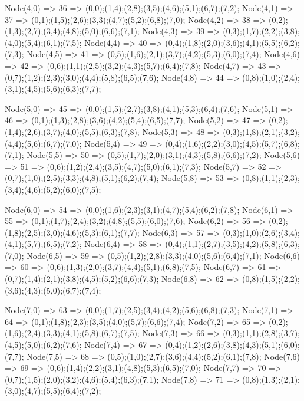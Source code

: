 Node(4,0) => 36 => (0,0);(1,4);(2,8);(3,5);(4,6);(5,1);(6,7);(7,2);
Node(4,1) => 37 => (0,1);(1,5);(2,6);(3,3);(4,7);(5,2);(6,8);(7,0);
Node(4,2) => 38 => (0,2);(1,3);(2,7);(3,4);(4,8);(5,0);(6,6);(7,1);
Node(4,3) => 39 => (0,3);(1,7);(2,2);(3,8);(4,0);(5,4);(6,1);(7,5);
Node(4,4) => 40 => (0,4);(1,8);(2,0);(3,6);(4,1);(5,5);(6,2);(7,3);
Node(4,5) => 41 => (0,5);(1,6);(2,1);(3,7);(4,2);(5,3);(6,0);(7,4);
Node(4,6) => 42 => (0,6);(1,1);(2,5);(3,2);(4,3);(5,7);(6,4);(7,8);
Node(4,7) => 43 => (0,7);(1,2);(2,3);(3,0);(4,4);(5,8);(6,5);(7,6);
Node(4,8) => 44 => (0,8);(1,0);(2,4);(3,1);(4,5);(5,6);(6,3);(7,7);



Node(5,0) => 45 => (0,0);(1,5);(2,7);(3,8);(4,1);(5,3);(6,4);(7,6);
Node(5,1) => 46 => (0,1);(1,3);(2,8);(3,6);(4,2);(5,4);(6,5);(7,7);
Node(5,2) => 47 => (0,2);(1,4);(2,6);(3,7);(4,0);(5,5);(6,3);(7,8);
Node(5,3) => 48 => (0,3);(1,8);(2,1);(3,2);(4,4);(5,6);(6,7);(7,0);
Node(5,4) => 49 => (0,4);(1,6);(2,2);(3,0);(4,5);(5,7);(6,8);(7,1);
Node(5,5) => 50 => (0,5);(1,7);(2,0);(3,1);(4,3);(5,8);(6,6);(7,2);
Node(5,6) => 51 => (0,6);(1,2);(2,4);(3,5);(4,7);(5,0);(6,1);(7,3);
Node(5,7) => 52 => (0,7);(1,0);(2,5);(3,3);(4,8);(5,1);(6,2);(7,4);
Node(5,8) => 53 => (0,8);(1,1);(2,3);(3,4);(4,6);(5,2);(6,0);(7,5);



Node(6,0) => 54 => (0,0);(1,6);(2,3);(3,1);(4,7);(5,4);(6,2);(7,8);
Node(6,1) => 55 => (0,1);(1,7);(2,4);(3,2);(4,8);(5,5);(6,0);(7,6);
Node(6,2) => 56 => (0,2);(1,8);(2,5);(3,0);(4,6);(5,3);(6,1);(7,7);
Node(6,3) => 57 => (0,3);(1,0);(2,6);(3,4);(4,1);(5,7);(6,5);(7,2);
Node(6,4) => 58 => (0,4);(1,1);(2,7);(3,5);(4,2);(5,8);(6,3);(7,0);
Node(6,5) => 59 => (0,5);(1,2);(2,8);(3,3);(4,0);(5,6);(6,4);(7,1);
Node(6,6) => 60 => (0,6);(1,3);(2,0);(3,7);(4,4);(5,1);(6,8);(7,5);
Node(6,7) => 61 => (0,7);(1,4);(2,1);(3,8);(4,5);(5,2);(6,6);(7,3);
Node(6,8) => 62 => (0,8);(1,5);(2,2);(3,6);(4,3);(5,0);(6,7);(7,4);



Node(7,0) => 63 => (0,0);(1,7);(2,5);(3,4);(4,2);(5,6);(6,8);(7,3);
Node(7,1) => 64 => (0,1);(1,8);(2,3);(3,5);(4,0);(5,7);(6,6);(7,4);
Node(7,2) => 65 => (0,2);(1,6);(2,4);(3,3);(4,1);(5,8);(6,7);(7,5);
Node(7,3) => 66 => (0,3);(1,1);(2,8);(3,7);(4,5);(5,0);(6,2);(7,6);
Node(7,4) => 67 => (0,4);(1,2);(2,6);(3,8);(4,3);(5,1);(6,0);(7,7);
Node(7,5) => 68 => (0,5);(1,0);(2,7);(3,6);(4,4);(5,2);(6,1);(7,8);
Node(7,6) => 69 => (0,6);(1,4);(2,2);(3,1);(4,8);(5,3);(6,5);(7,0);
Node(7,7) => 70 => (0,7);(1,5);(2,0);(3,2);(4,6);(5,4);(6,3);(7,1);
Node(7,8) => 71 => (0,8);(1,3);(2,1);(3,0);(4,7);(5,5);(6,4);(7,2);



